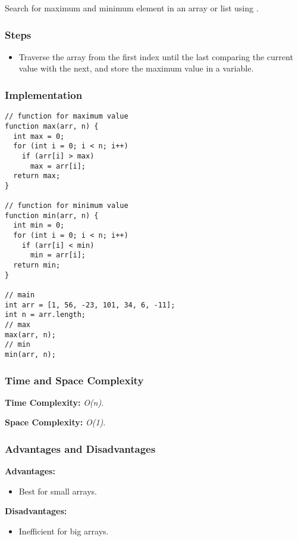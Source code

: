 Search for maximum and minimum element in an array or list using \linearsch.

\subsubsection*{Steps}

\begin{itemize}
  \item Traverse the array from the first index until the last comparing the current value with the next, and store the maximum value in a variable.
\end{itemize}

\subsubsection*{Implementation}

\begin{lstlisting}[style=general]
// function for maximum value
function max(arr, n) {
  int max = 0;
  for (int i = 0; i < n; i++)
    if (arr[i] > max)
      max = arr[i];
  return max;
}

// function for minimum value
function min(arr, n) {
  int min = 0;
  for (int i = 0; i < n; i++)
    if (arr[i] < min)
      min = arr[i];
  return min;
}

// main
int arr = [1, 56, -23, 101, 34, 6, -11];
int n = arr.length;
// max
max(arr, n);
// min
min(arr, n);
\end{lstlisting}

\subsubsection*{Time and Space Complexity}

\textbf{Time Complexity:} \textit{O(n)}.

\textbf{Space Complexity:} \textit{O(1)}.

\subsubsection*{Advantages and Disadvantages}

\textbf{Advantages:}

\begin{itemize}
  \item Best for small arrays.
\end{itemize}

\textbf{Disadvantages:}

\begin{itemize}
  \item Inefficient for big arrays.
\end{itemize}
